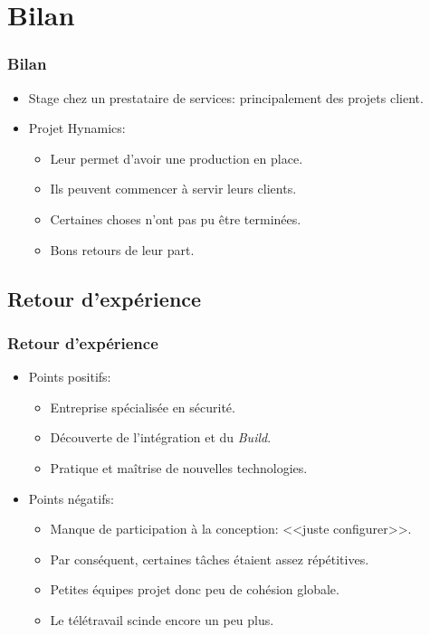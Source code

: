 \documentclass[french, a4paper]{beamer}
\begin{document}
\section{Bilan}

\begin{frame}
    \frametitle{Bilan}
    \begin{itemize}
        \item Stage chez un prestataire de services: principalement des projets
            client.
        \item Projet Hynamics:
        \begin{itemize}
            \item Leur permet d'avoir une production en place.
            \item Ils peuvent commencer à servir leurs clients.
            \item Certaines choses n'ont pas pu être terminées.
            \item Bons retours de leur part.
        \end{itemize}
    \end{itemize}
\end{frame}

\subsection{Retour d'expérience}

\begin{frame}
    \frametitle{Retour d'expérience}
    \begin{itemize}
        \item Points positifs:
        \begin{itemize}
            \item Entreprise spécialisée en sécurité.
            \item Découverte de l'intégration et du \textit{Build}.
            \item Pratique et maîtrise de nouvelles technologies.
        \end{itemize}
        \item Points négatifs:
        \begin{itemize}
            \item Manque de participation à la conception: <<juste configurer>>.
            \item Par conséquent, certaines tâches étaient assez répétitives.
            \item Petites équipes projet donc peu de cohésion globale.
            \item Le télétravail scinde encore un peu plus.
        \end{itemize}
    \end{itemize}
\end{frame}
\end{document}
